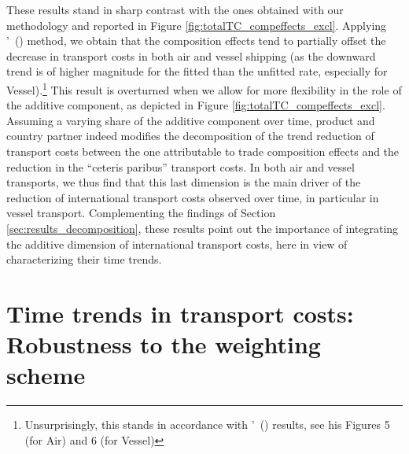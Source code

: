 \documentclass[a4paper,11pt]{article}
\newcommand\citeh[1]{\citeauthor{#1}'\ (\citeyear{#1})}
\begin{document}
These results stand in sharp contrast with the ones obtained with our methodology and reported in Figure \ref{fig:totalTC_compeffects_excl}. Applying \citeh{hummels2007} method, we obtain that the composition effects tend to partially offset the decrease in transport costs in both air and vessel shipping (as the downward trend is of higher magnitude for the fitted than the unfitted rate, especially for Vessel).\footnote{Unsurprisingly, this stands in accordance with \citeh{hummels2007} results, see his Figures 5 (for Air) and 6 (for Vessel)} This result is overturned when we allow for more flexibility in the role of the additive component, as depicted in Figure \ref{fig:totalTC_compeffects_excl}. Assuming a varying share of the additive component over time, product and country partner indeed modifies the decomposition of the trend reduction of transport costs between the one attributable to trade composition effects and the reduction in the ``ceteris paribus'' transport costs. In both air and vessel transports, we thus find that this last dimension is the main driver of the reduction of international transport costs observed over time, in particular in vessel transport. Complementing the findings of Section \ref{sec:results_decomposition}, these results point out the importance of integrating the additive dimension of international transport costs, here in view of characterizing their time trends.










\section{Time trends in transport costs: Robustness to the weighting scheme \label{sec:robustness}}
\end{document}
